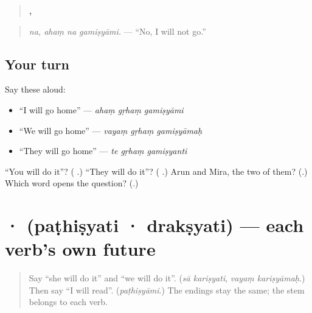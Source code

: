 \begin{quote}
\textbf{,   }
\end{quote}

\begin{quote}
\emph{na, ahaṃ na gamiṣyāmi.} — \textquotedblleft{}No, I will not go.\textquotedblright{}
\end{quote}

\subsection*{Your turn}
Say these aloud:

\begin{itemize}
\raggedright
  \item \textquotedblleft{}I will go home\textquotedblright{} — \emph{ahaṃ gṛhaṃ gamiṣyāmi}
  \item \textquotedblleft{}We will go home\textquotedblright{} — \emph{vayaṃ gṛhaṃ gamiṣyāmaḥ}
  \item \textquotedblleft{}They will go home\textquotedblright{} — \emph{te gṛhaṃ gamiṣyanti}
\end{itemize}

\begin{tcolorbox}[breakable,colback=teal!4,colframe=teal!35!black,title={Before you move on}]
\textquotedblleft{}You will do it\textquotedblright{}? (\textbf{ }.) \textquotedblleft{}They will do it\textquotedblright{}? (\textbf{ }.) Arun and Mira, the two of them? (\textbf{}.) Which word opens the question? (\textbf{}.)
\end{tcolorbox}
\section[\texorpdfstring{\sk{पठिष्यति} · \sk{द्रक्ष्यति} (paṭhiṣyati …)}{पठिष्यति · द्रक्ष्यति (paṭhiṣyati …)}]{ ·  (paṭhiṣyati · drakṣyati) — each verb's own future}

\label{lesson:SA-C275-pathisyati}



\begin{quote}
Say \textquotedblleft{}she will do it\textquotedblright{} and \textquotedblleft{}we will do it\textquotedblright{}. (\emph{sā kariṣyati}, \emph{vayaṃ kariṣyāmaḥ}.) Then say \textquotedblleft{}I will read\textquotedblright{}. (\emph{paṭhiṣyāmi}.) The endings stay the same; the stem belongs to each verb.
\end{quote}

